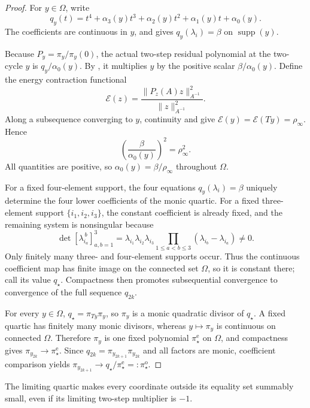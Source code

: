 \documentclass[11pt]{article}
\begin{document}
\begin{proof}
For \(y\in\Omega\), write
\[
 q_y(t)=t^4+\alpha_3(y)t^3+\alpha_2(y)t^2+
             \alpha_1(y)t+\alpha_0(y).
\]
The coefficients are continuous in \(y\), and
 gives \(q_y(\lambda_i)=\beta\) on
\(\operatorname{supp}(y)\).

Because \(P_y=\pi_y/\pi_y(0)\), the actual two-step residual polynomial at
the two-cycle \(y\) is \(q_y/\alpha_0(y)\).  By
, it multiplies \(y\) by the positive scalar
\(\beta/\alpha_0(y)\).  Define the energy contraction functional
\[
 \mathcal E(z)=\frac{\lVert P_z(A)z\rVert_{A^{-1}}^2}
                    {\lVert z\rVert_{A^{-1}}^2}.
\]
Along a subsequence converging to \(y\), continuity and
 give
\(\mathcal E(y)=\mathcal E(Ty)=\rho_\infty\).  Hence
\[
 \left(\frac{\beta}{\alpha_0(y)}\right)^2=\rho_\infty^2.
\]
All quantities are positive, so
\(\alpha_0(y)=\beta/\rho_\infty\) throughout \(\Omega\).

For a fixed four-element support, the four equations
\(q_y(\lambda_i)=\beta\) uniquely determine the four lower coefficients of
the monic quartic.  For a fixed three-element support
\(\{i_1,i_2,i_3\}\), the constant coefficient is already fixed, and the
remaining system is nonsingular because
\[
 \det[\lambda_{i_a}^{\,b}]_{a,b=1}^3
 =\lambda_{i_1}\lambda_{i_2}\lambda_{i_3}
   \prod_{1\leq a<b\leq3}(\lambda_{i_b}-\lambda_{i_a})\neq0.
\]
Only finitely many three- and four-element supports occur.  Thus the
continuous coefficient map has finite image on the connected set
\(\Omega\), so it is constant there; call its value \(q_\star\).
Compactness then promotes subsequential convergence to convergence of the
full sequence \(q_{2k}\).

For every \(y\in\Omega\),
\(q_\star=\pi_{Ty}\pi_y\), so \(\pi_y\) is a monic quadratic divisor of
\(q_\star\).  A fixed quartic has finitely many monic divisors, whereas
\(y\mapsto\pi_y\) is continuous on connected \(\Omega\).  Therefore
\(\pi_y\) is one fixed polynomial \(\pi_\star^{\mathrm e}\) on
\(\Omega\), and compactness gives
\(\pi_{y_{2k}}\to\pi_\star^{\mathrm e}\).
Since \(q_{2k}=\pi_{y_{2k+1}}\pi_{y_{2k}}\) and all factors are monic,
coefficient comparison yields
\(\pi_{y_{2k+1}}\to
q_\star/\pi_\star^{\mathrm e}=:\pi_\star^{\mathrm o}\).
\end{proof}

The limiting quartic makes every coordinate outside its equality set
summably small, even if its limiting two-step multiplier is \(-1\).
\end{document}
